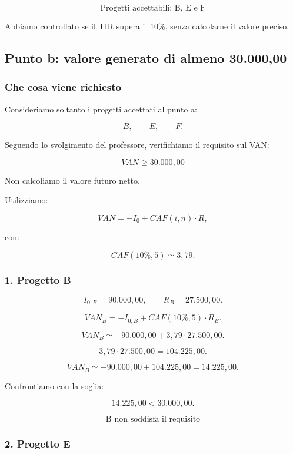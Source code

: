 \[
\boxed{
\text{Progetti accettabili: B, E e F}
}
\]

\noindent Abbiamo controllato
se il TIR supera il 10\%,
senza calcolarne il valore preciso.


\subsection{Punto b:
valore generato di almeno 30.000,00}

\subsubsection*{Che cosa viene richiesto}

\noindent Consideriamo soltanto
i progetti accettati al punto a:

\[
B,\qquad E,\qquad F.
\]

\noindent Seguendo lo svolgimento
del professore,
verifichiamo il requisito sul VAN:

\[
\boxed{VAN\geq30.000{,}00}
\]

\noindent Non calcoliamo
il valore futuro netto.

\noindent Utilizziamo:

\[
VAN=-I_0+CAF(i,n)\cdot R,
\]

\noindent con:

\[
CAF(10\%,5)\simeq3{,}79.
\]


\subsubsection*{1. Progetto B}

\[
I_{0,B}=90.000{,}00,
\qquad
R_B=27.500{,}00.
\]

\[
VAN_B
=
-I_{0,B}+CAF(10\%,5)\cdot R_B.
\]

\[
VAN_B
\simeq
-90.000{,}00+3{,}79\cdot27.500{,}00.
\]

\[
3{,}79\cdot27.500{,}00
=
104.225{,}00.
\]

\[
VAN_B
\simeq
-90.000{,}00+104.225{,}00
=
\boxed{14.225{,}00}.
\]

\noindent Confrontiamo con la soglia:

\[
14.225{,}00<30.000{,}00.
\]

\[
\boxed{
\text{B non soddisfa il requisito}
}
\]


\subsubsection*{2. Progetto E}

